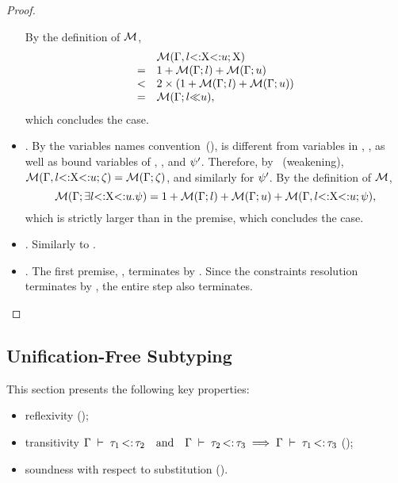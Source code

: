 \begin{proof}
\begin{itemize}
            By the definition of $\operatorname{\mathcal{M}}$,
            \[
                \begin{array}{cl}
                    & \operatorname{\mathcal{M}}(\Gamma, l{\operatorname{<:}}\mathrm{X}{\operatorname{<:}}u;\mathrm{X}) \\
                  = & 1 + \operatorname{\mathcal{M}}(\Gamma;l) + \operatorname{\mathcal{M}}(\Gamma;u) \\
                  < & 2\times(1 + \operatorname{\mathcal{M}}(\Gamma;l) + \operatorname{\mathcal{M}}(\Gamma;u)) \\
                  = & \operatorname{\mathcal{M}}(\Gamma;l{\operatorname{\ll}}u),
                \end{array}
            \]
            which concludes the case.
        \item {}. By the variables names
            convention~(), \vx is different from variables
            in \AEnv, \UEnv, as well as bound variables of \dctxsig, \tysig,
            and $\psi'$. Therefore, by~ (weakening),
            $\operatorname{\mathcal{M}}(\Gamma, l{\operatorname{<:}}\mathrm{X}{\operatorname{<:}}u;\zeta) = 
            \operatorname{\mathcal{M}}(\Gamma;\zeta)$, and similarly for $\psi'$.
            By the definition of $\operatorname{\mathcal{M}}$,
            \[\operatorname{\mathcal{M}}(\Gamma;\exists l{\operatorname{<:}}\mathrm{X}{\operatorname{<:}}u.\psi) = 1 +
                \operatorname{\mathcal{M}}(\Gamma;l) + \operatorname{\mathcal{M}}(\Gamma;u) + 
                \operatorname{\mathcal{M}}(\Gamma, l{\operatorname{<:}}\mathrm{X}{\operatorname{<:}}u;\psi),\]
            which is strictly larger than
            \tymsr{\AEnv, \varbound{\vx}{\tylb}{\tyub}}{\tysig} in the premise,
            which concludes the case.
        \item {}. Similarly to .
        \item {}. The first premise,
            ,
            terminates by .
            Since the constraints resolution \solvectrdflt terminates
            by , the entire step also terminates.
    \end{itemize}
\end{proof}


\subsection{Unification-Free Subtyping}%
\label{subsec:props-subty-proof}

This section presents the following key properties:
\begin{itemize}
    \item reflexivity \subtydflt{\ty}{\ty} ();
    \item transitivity $\subtydflt{\ty_1}{\ty_2} \ \ \text{ and }\ \ 
        \subtydflt{\ty_2}{\ty_3} \implies \subtydflt{\ty_1}{\ty_3}$
        (\thmref{thm:sub-ty-trans});
    \item soundness with respect to substitution ().
\end{itemize}

